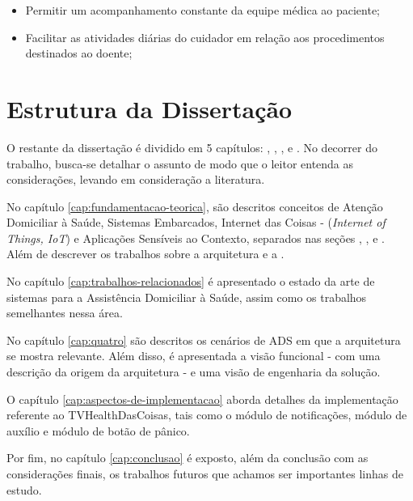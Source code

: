 \begin{itemize}
  \item Permitir um acompanhamento constante da equipe médica ao paciente;
  \item Facilitar as atividades diárias do cuidador em relação aos procedimentos
  destinados ao doente;
\end{itemize}

\section{Estrutura da Dissertação}\label{sec:estrutura}

O restante da dissertação é dividido em 5 capítulos: ,
, , 
e . No decorrer do trabalho, busca-se detalhar o assunto de modo que o
leitor entenda as considerações, levando em consideração a literatura. 

No capítulo \ref{cap:fundamentacao-teorica}, são descritos conceitos de Atenção
Domiciliar à Saúde, Sistemas Embarcados, Internet das Coisas -
(\textit{Internet of Things, IoT}) e Aplicações Sensíveis ao Contexto,
separados nas seções , ,
 e . Além de descrever os trabalhos sobre
a arquitetura  e a .

No capítulo \ref{cap:trabalhos-relacionados} é apresentado o estado da arte de
sistemas para a Assistência Domiciliar à Saúde, assim como os trabalhos semelhantes
nessa área.

No capítulo \ref{cap:quatro} são descritos os cenários de ADS em que a arquitetura
se mostra relevante. Além disso, é apresentada a visão funcional - com uma descrição
da origem da arquitetura - e uma visão de engenharia da solução.

O capítulo \ref{cap:aspectos-de-implementacao} aborda detalhes da implementação
referente ao TVHealthDasCoisas, tais como o módulo de notificações, módulo de 
auxílio e módulo de botão de pânico.

Por fim, no capítulo \ref{cap:conclusao} é exposto, além da conclusão com as 
considerações finais, os trabalhos futuros que achamos ser importantes linhas
de estudo.
